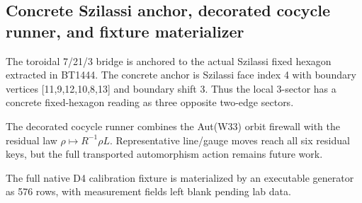 \subsection{Concrete Szilassi anchor, decorated cocycle runner, and fixture materializer}
\label{sec:bt1517-bt1519-szilassi-cocycle-fixture}

The toroidal 7/21/3 bridge is anchored to the actual Szilassi fixed hexagon extracted in BT1444.  The concrete anchor is Szilassi face index 4 with boundary vertices [11,9,12,10,8,13] and boundary shift 3.  Thus the local 3-sector has a concrete fixed-hexagon reading as three opposite two-edge sectors.

The decorated cocycle runner combines the Aut(W33) orbit firewall with the residual law \(\rho\mapsto R^{-1}\rho L\).  Representative line/gauge moves reach all six residual keys, but the full transported automorphism action remains future work.

The full native D4 calibration fixture is materialized by an executable generator as 576 rows, with measurement fields left blank pending lab data.
